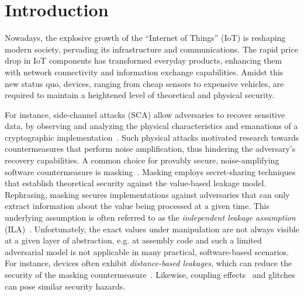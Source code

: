 \section{Introduction}
Nowadays, the explosive growth of the ``Internet of Things'' (IoT) is reshaping modern society, pervading its infrastructure and communications.
The rapid price drop in IoT components has transformed everyday products, enhancing them with network connectivity and information exchange capabilities. Amidst this new status quo, devices, ranging from cheap sensors to expensive vehicles, are required to maintain a heightened level of theoretical and physical security.

For instance, side-channel attacks (SCA) allow adversaries to recover sensitive data, 
by observing and analyzing the physical characteristics and emanations of a cryptographic 
implementation~\cite{DBLP:conf/crypto/KocherJJ99}. 
Such physical attacks motivated research towards countermeasures 
that perform noise amplification, 
thus hindering the adversary's recovery capabilities. 
A common choice for provably secure, noise-amplifying software countermeasure is 
masking~\cite{DBLP:conf/crypto/ChariJRR99,DBLP:conf/crypto/IshaiSW03}. 
Masking employs secret-sharing techniques that establish theoretical security 
against the value-based leakage model. Rephrasing, masking secures implementations 
against adversaries that can only extract information about the value being 
processed at a given time. This underlying assumption is often referred to as the 
\emph{independent leakage assumption} (ILA)~\cite{DBLP:conf/eurocrypt/RenauldSVKF11}. 
Unfortunately, the exact values under manipulation are not always visible at a given 
layer of abstraction, e.g. at assembly code and such a limited adversarial model is 
not applicable in many practical, software-based scenarios. For instance, devices often 
exhibit \emph{distance-based leakages}, which can reduce the security of the masking 
countermeasure~\cite{DBLP:conf/cardis/BalaschGGRS14, DBLP:journals/iacr/GrootPPSB16}. 
Likewise, coupling effects~\cite{DBLP:conf/eurocrypt/RenauldSVKF11} and 
glitches~\cite{DBLP:conf/ches/MangardS06} can pose similar security hazards.

